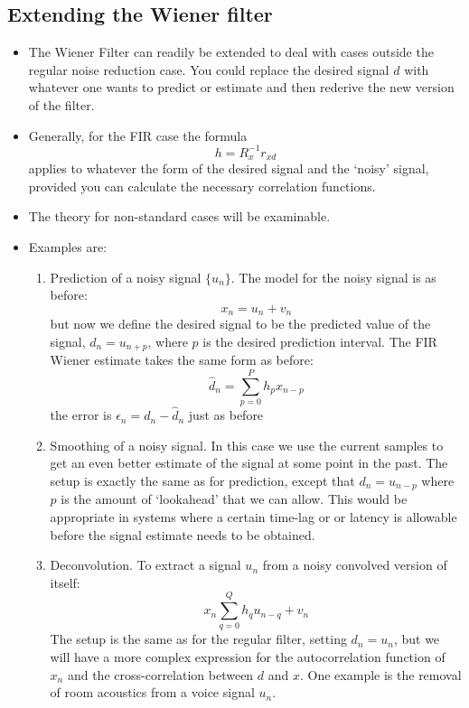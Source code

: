 \documentclass[12pt]{article}
\newcommand{\summ}[2]{\sum_{#1}^{#2}}
\newcommand{\sumpzerop}{\summ{p=0}{P}}
\newcommand{\desest}{\hat{d}_n}
\newcommand{\des}{d_n}
\newcommand{\err}{\epsilon_n}
\begin{document}
\subsection{Extending the Wiener filter}
\begin{itemize}
    \item The Wiener Filter can readily be extended to deal with cases outside the regular noise reduction case. You could replace the desired signal $d$ with whatever one wants to predict or estimate and then rederive the new version of the filter.
    \item Generally, for the FIR case the formula
    \[
    h = R_x^{-1}r_{xd}
    \]
    applies to whatever the form of the desired signal and the `noisy' signal, provided you can calculate the necessary correlation functions.
    \item The theory for non-standard cases will be examinable.
    \item Examples are:
    \begin{enumerate}
        \item Prediction of a noisy signal $\{u_n\}$. The model for the noisy signal is as before:
        \[
        x_n = u_n + v_n
        \]
        but now we define the desired signal to be the predicted value of the signal, $d_n = u_{n+p}$, where $p$ is the desired prediction interval. The FIR Wiener estimate takes the same form as before:
        \[
        \desest = \sumpzerop h_p x_{n-p}
        \]
        the error is $\err = \des - \desest$ just as before
        \item Smoothing of a noisy signal. In this case we use the current samples to get an even better estimate of the signal at some point in the past. The setup is exactly the same as for prediction, except that $d_n = u_{n-p}$ where $p$ is the amount of `lookahead' that we can allow. This would be appropriate in systems where a certain time-lag or or latency is allowable before the signal estimate needs to be obtained.
        \item Deconvolution. To extract a signal $u_n$ from a noisy convolved version of itself:
        \[
        x_n \sum_{q=0}^Q h_q u_{n-q} + v_n
        \] 
        The setup is the same as for the regular filter, setting $d_n = u_n$, but we will have a more complex expression for the autocorrelation function of $x_n$ and the cross-correlation between $d$ and $x$.
        One example is the removal of room acoustics from a voice signal $u_n$.
    \end{enumerate}
\end{itemize}
\end{document}
